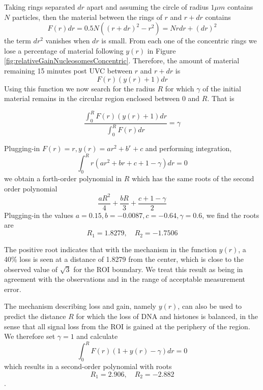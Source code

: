 \documentclass[12pt]{report}
\begin{document}
Taking rings separated  $dr$ apart and assuming the circle of radius  $1 \mu m$ contains $N$ particles, then the material between the rings of $r$ and $r+dr$ contains  
\begin{equation*}
F(r)dr = 0.5N\left((r+dr)^2- r^2\right)=Nrdr+(dr)^2
\end{equation*}
the term $dr ^2$ vanishes when $dr$ is small.
From each one of the concentric rings we lose a percentage of material following $y(r)$ in Figure \ref{fig:relativeGainNucleosomesConcentric}. Therefore, the amount of material remaining 15 minutes post UVC between $r$ and $r+dr$ is
\begin{equation*}
F(r)(y(r)+1)dr
\end{equation*}
Using this function we now search for the radius $R$ for which $\gamma$ of the initial material remains in the circular region enclosed between 0 and $R$. That is 

\begin{equation*}
\frac{\int_0^RF(r)(y(r)+1)dr}{\int_0^RF(r)dr} =\gamma
\end{equation*} 

Plugging-in  $F(r)=r,y(r)=ar^2 +b^r +c$ and performing integration, 
\begin{equation*}
\int_0^R r(ar^2 +br+c +1-\gamma)dr =0
\end{equation*}
we obtain a forth-order polynomial  in $R$ which has the same roots of the second order polynomial 
\begin{equation*}
\frac{aR^2}{4} +\frac{bR}{3} +\frac{c+1-\gamma}{2}
\end{equation*}
Plugging-in the values $a=0.15, b=-0.0087,c=-0.64, \gamma=0.6$, we find the roots are 
\begin{equation*}
R_1=1.8279, \quad R_2= -1.7506
\end{equation*}

The positive root indicates that with the mechanism in the function $y(r)$, a 40\% loss is seen at a distance of 1.8279 from the center, which is close to the observed value of $\sqrt{3}$ for the ROI boundary. We treat this result as being in agreement with the observations and in the range of acceptable measurement error.

The mechanism describing loss and gain, namely $y(r)$, can also be used to predict the distance $R$ for which the loss of DNA and histones is balanced, in the sense that all signal loss from the ROI is gained at the periphery of the region. We therefore set $\gamma =1$ and calculate
\begin{equation*}
\int_0^R F(r)(1+y(r)-\gamma)dr = 0
\end{equation*}
which results in a second-order polynomial with roots 
\begin{equation*}
R_1=2.906, \quad R_2=-2.882
\end{equation*}.
\end{document}
